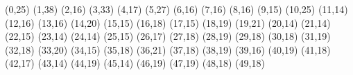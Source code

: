 (0,25)
(1,38)
(2,16)
(3,33)
(4,17)
(5,27)
(6,16)
(7,16)
(8,16)
(9,15)
(10,25)
(11,14)
(12,16)
(13,16)
(14,20)
(15,15)
(16,18)
(17,15)
(18,19)
(19,21)
(20,14)
(21,14)
(22,15)
(23,14)
(24,14)
(25,15)
(26,17)
(27,18)
(28,19)
(29,18)
(30,18)
(31,19)
(32,18)
(33,20)
(34,15)
(35,18)
(36,21)
(37,18)
(38,19)
(39,16)
(40,19)
(41,18)
(42,17)
(43,14)
(44,19)
(45,14)
(46,19)
(47,19)
(48,18)
(49,18)
